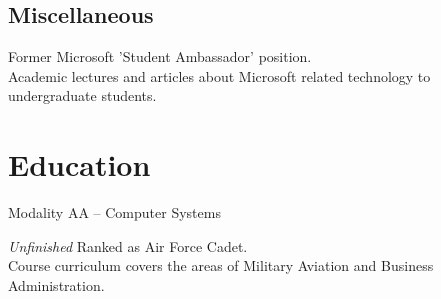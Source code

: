 \documentclass[11pt, a4paper, sans]{moderncv} %
\begin{document}
\subsection{Miscellaneous}




{
Former Microsoft 'Student Ambassador' position.\\
Academic lectures and articles about Microsoft related technology to undergraduate students.
}









\section{Education}

{
Modality AA -- Computer Systems
}  

{\textit{Unfinished}}
{
Ranked as Air Force Cadet. \\
Course curriculum covers the areas of Military Aviation and Business Administration. 
}
\end{document}
